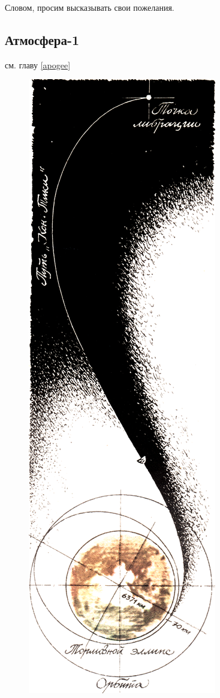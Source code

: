 \documentclass[11pt,a4paper,oneside]{article}
\begin{document}
Словом, просим высказывать свои пожелания.

\newpage 
\subsection{Атмосфера-1}
см. главу \ref{apogee}

\begin{figure}
\includegraphics[height=0.85\textheight]{apogee2}
\end{figure}
\end{document}
